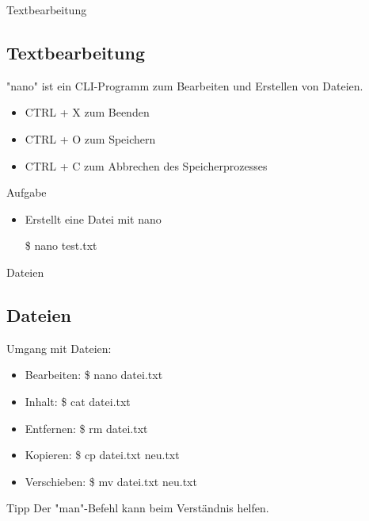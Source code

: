 \begin{frame}{Textbearbeitung}
    \subsection{Textbearbeitung}\label{subsec:textbearbeitung}

    "nano" ist ein CLI-Programm zum Bearbeiten und Erstellen von Dateien.

    \begin{itemize}
        \item CTRL + X zum Beenden
        \item CTRL + O zum Speichern
        \item CTRL + C zum Abbrechen des Speicherprozesses
    \end{itemize}

    \vspace{0.5cm}
    \begin{alertblock}{Aufgabe}
        \begin{itemize}
            \item Erstellt eine Datei mit nano
            \item[\$] nano test.txt
        \end{itemize}
    \end{alertblock}

\end{frame}

\begin{frame}{Dateien}
    \subsection{Dateien}\label{subsec:dateien}

    Umgang mit Dateien:

    \begin{itemize}
        \item Bearbeiten: \$ nano datei.txt
        \item Inhalt: \$ cat datei.txt
        \item Entfernen: \$ rm datei.txt
        \item Kopieren: \$ cp datei.txt neu.txt
        \item Verschieben: \$ mv datei.txt neu.txt
    \end{itemize}

    \vspace{0.5cm}
    \begin{exampleblock}{Tipp}
        Der "man"-Befehl kann beim Verständnis helfen.
    \end{exampleblock}

\end{frame}

